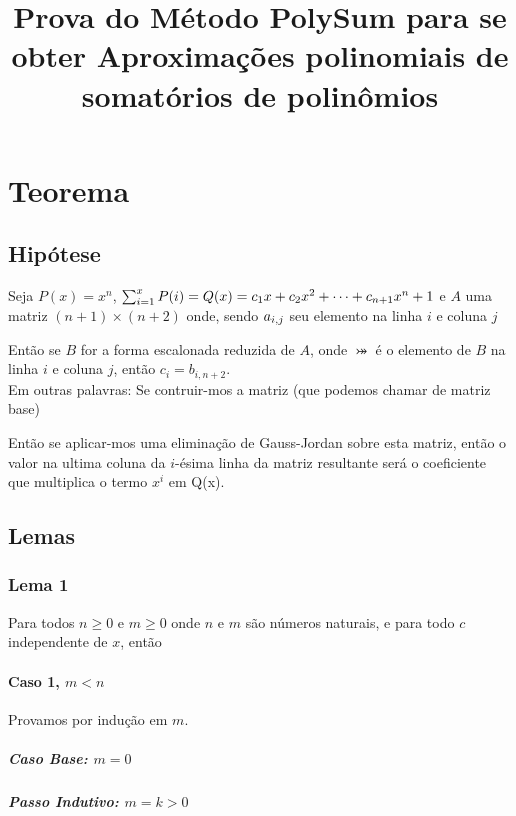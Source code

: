 \documentclass[a4paper, 10pt]{article}
\title{Prova do M\'etodo PolySum para se obter Aproxima\c{c}\~oes polinomiais de somat\'orios de polin\^omios}
\begin{document}
\allowdisplaybreaks
\maketitle

\section{Teorema}
\subsection{Hip\'otese}

Seja $P(x) = x^n$, $\sum_{i=1}^{x}P(i) = Q(x) = c_1x + c_2x^2 + \cdots + c_{n+1}x^n+1$ e $A$ uma matriz $(n+1) \times (n+2)$ onde, sendo $a_{i,j}$ seu elemento na linha $i$ e coluna $j$

\aijDef

Ent\~ao se $B$ for a forma escalonada reduzida de $A$, onde $\bij$ \'e o elemento de $B$ na linha $i$ e coluna $j$, ent\~ao $c_i = b_{i,n+2}$.\\

Em outras palavras: Se contruir-mos a matriz (que podemos chamar de matriz base)

\AMatrix

Ent\~ao se aplicar-mos uma elimina\c{c}\~ao de Gauss-Jordan sobre esta matriz, ent\~ao o valor na ultima coluna da $i$-\'esima linha da matriz resultante ser\'a o coeficiente que multiplica o termo $x^i$ em Q(x).

\subsection{Lemas}
\subsubsection{Lema 1}

Para todos $n \geq 0$ e $m \geq 0$ onde $n$ e $m$ s\~ao n\'umeros naturais, e para todo $c$ independente de $x$, ent\~ao
\lemmaOne

\paragraph{Caso 1, $m < n$}

Provamos por indu\c{c}\~ao em $m$.

\subparagraph{Caso Base: $m = 0$}

\lemmaOneCaseOneBase

\subparagraph{Passo Indutivo: $m = k > 0$}
\end{document}
